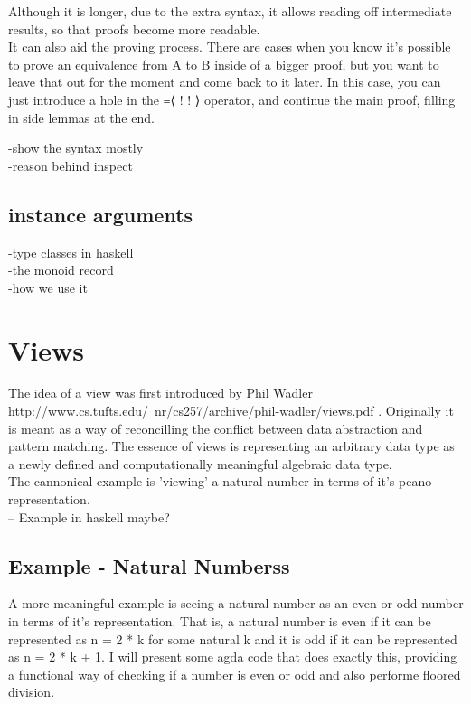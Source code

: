 \documentclass[12pt,twoside,notitlepage]{report}
\begin{document}
  Although it is longer, due to the extra syntax, it allows reading off intermediate results, so that
  proofs become more readable. \\
  It can also aid the proving process. There are cases when you know it's
  possible to prove an equivalence from A to B inside of a bigger proof, but you want to leave that out
  for the moment and come back to it later.
  In this case, you can just introduce a hole in the ≡⟨ {!   !} ⟩ operator, and continue the main proof,
  filling in side lemmas at the end.


-show the syntax mostly\\
-reason behind inspect\\



\subsection{instance arguments}

-type classes in haskell\\
-the monoid record\\
-how we use it\\

\section{Views}

 The idea of a view was first introduced by Phil Wadler \cite{wadler} http://www.cs.tufts.edu/~nr/cs257/archive/phil-wadler/views.pdf . Originally
   it is meant as a way of reconcilling the conflict between data abstraction and pattern matching. The essence of views is representing an arbitrary
   data type as a newly defined and computationally meaningful algebraic data type. \\
 The cannonical example is 'viewing' a natural number in terms of it's peano representation. \\
 -- Example in haskell maybe?

 
\subsection{Example - Natural Numberss} 
 A more meaningful example is seeing a natural number as an even or odd number in terms of it's representation. That is, a
 natural number is even if it can be represented as n = 2 * k for some natural k and it is odd if it can be represented as
 n = 2 * k + 1.
 I will present some agda code that does exactly this, providing a functional way of checking if a number is even or odd and also
 performe floored division.
\end{document}
